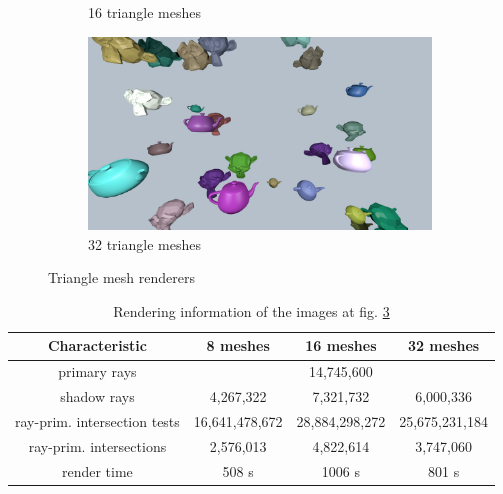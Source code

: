 \documentclass{article}
\begin{document}
\begin{figure}[h]
\begin{subfigure}{0.3\textwidth}
		\caption{16 triangle meshes}
		\label{fig:16meshes}
	\end{subfigure}
	\hfill
	\begin{subfigure}{0.3\textwidth}
		\includegraphics[width=\textwidth]{32_triangle_meshes}
		\caption{32 triangle meshes}
		\label{fig:32meshes}
	\end{subfigure}
	
	\caption{Triangle mesh renderers}
	\label{fig:meshes}
\end{figure}

\begin{table}[!ht]
\centering
	\begin{tabular}{*4c} 
		\hline
 		Characteristic & 8 meshes & 16 meshes & 32 meshes \\ [0.5ex] 
 		\hline\hline
 		primary rays & \multicolumn{3}{c}{14,745,600} \\ 
 		shadow rays & 4,267,322 & 7,321,732 & 6,000,336\\
 		ray-prim. intersection tests & 16,641,478,672 & 28,884,298,272 & 25,675,231,184 \\
 		ray-prim. intersections & 2,576,013 & 4,822,614 & 3,747,060 \\
 		render time & 508 s & 1006 s & 801 s \\
 		\hline
	\end{tabular}
\caption{Rendering information of the images at fig. \ref{fig:meshes}}
\label{table:mesh_stat}
\end{table}


\end{document}

